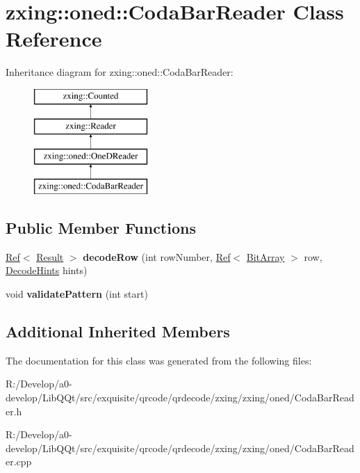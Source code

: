 \hypertarget{classzxing_1_1oned_1_1_coda_bar_reader}{}\section{zxing\+:\+:oned\+:\+:Coda\+Bar\+Reader Class Reference}
\label{classzxing_1_1oned_1_1_coda_bar_reader}
Inheritance diagram for zxing\+:\+:oned\+:\+:Coda\+Bar\+Reader\+:\begin{figure}[H]
\begin{center}
\leavevmode
\includegraphics[height=4.000000cm]{classzxing_1_1oned_1_1_coda_bar_reader}
\end{center}
\end{figure}
\subsection*{Public Member Functions}
\begin{DoxyCompactItemize}
\item 
\mbox{\label{classzxing_1_1oned_1_1_coda_bar_reader_a9c51d6c02147ef266fdc7726b98bcf3e}} 
\mbox{\hyperlink{classzxing_1_1_ref}{Ref}}$<$ \mbox{\hyperlink{classzxing_1_1_result}{Result}} $>$ {\bfseries decode\+Row} (int row\+Number, \mbox{\hyperlink{classzxing_1_1_ref}{Ref}}$<$ \mbox{\hyperlink{classzxing_1_1_bit_array}{Bit\+Array}} $>$ row, \mbox{\hyperlink{classzxing_1_1_decode_hints}{Decode\+Hints}} hints)
\item 
\mbox{\label{classzxing_1_1oned_1_1_coda_bar_reader_ab1b26b1d536ce7280cb9ecfd4041afe9}} 
void {\bfseries validate\+Pattern} (int start)
\end{DoxyCompactItemize}
\subsection*{Additional Inherited Members}


The documentation for this class was generated from the following files\+:\begin{DoxyCompactItemize}
\item 
R\+:/\+Develop/a0-\/develop/\+Lib\+Q\+Qt/src/exquisite/qrcode/qrdecode/zxing/zxing/oned/Coda\+Bar\+Reader.\+h\item 
R\+:/\+Develop/a0-\/develop/\+Lib\+Q\+Qt/src/exquisite/qrcode/qrdecode/zxing/zxing/oned/Coda\+Bar\+Reader.\+cpp\end{DoxyCompactItemize}
